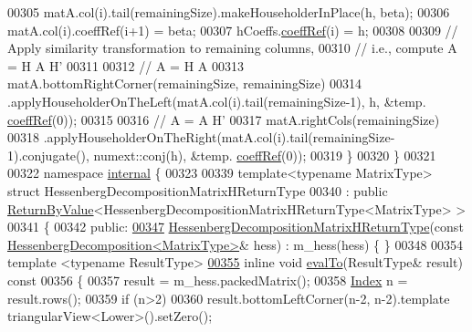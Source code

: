 \begin{DoxyCode}
00305     matA.col(i).tail(remainingSize).makeHouseholderInPlace(h, beta);
00306     matA.col(i).coeffRef(i+1) = beta;
00307     hCoeffs.\hyperlink{class_eigen_1_1_plain_object_base_a25626a55b26a4323565f79d1b7c48ea8}{coeffRef}(i) = h;
00308 
00309     \textcolor{comment}{// Apply similarity transformation to remaining columns,}
00310     \textcolor{comment}{// i.e., compute A = H A H'}
00311 
00312     \textcolor{comment}{// A = H A}
00313     matA.bottomRightCorner(remainingSize, remainingSize)
00314         .applyHouseholderOnTheLeft(matA.col(i).tail(remainingSize-1), h, &temp.
      \hyperlink{class_eigen_1_1_plain_object_base_a25626a55b26a4323565f79d1b7c48ea8}{coeffRef}(0));
00315 
00316     \textcolor{comment}{// A = A H'}
00317     matA.rightCols(remainingSize)
00318         .applyHouseholderOnTheRight(matA.col(i).tail(remainingSize-1).conjugate(), numext::conj(h), &temp.
      \hyperlink{class_eigen_1_1_plain_object_base_a25626a55b26a4323565f79d1b7c48ea8}{coeffRef}(0));
00319   \}
00320 \}
00321 
00322 \textcolor{keyword}{namespace }\hyperlink{namespaceinternal}{internal} \{
00323 
00339 \textcolor{keyword}{template}<\textcolor{keyword}{typename} MatrixType> \textcolor{keyword}{struct }HessenbergDecompositionMatrixHReturnType
00340 : \textcolor{keyword}{public} \hyperlink{group___core___module_class_eigen_1_1_return_by_value}{ReturnByValue}<HessenbergDecompositionMatrixHReturnType<MatrixType> >
00341 \{
00342   \textcolor{keyword}{public}:
\hyperlink{group___eigenvalues___module_aa6d46d84c1343c964c50457ca4ddf9fa}{00347}     \hyperlink{group___eigenvalues___module_aa6d46d84c1343c964c50457ca4ddf9fa}{HessenbergDecompositionMatrixHReturnType}(\textcolor{keyword}{const} 
      \hyperlink{group___eigenvalues___module}{HessenbergDecomposition<MatrixType>}& hess) : m\_hess(hess) \{ \}
00348 
00354     \textcolor{keyword}{template} <\textcolor{keyword}{typename} ResultType>
\hyperlink{group___eigenvalues___module_a7f1d84113072d2d2e507d3821ff9f15c}{00355}     \textcolor{keyword}{inline} \textcolor{keywordtype}{void} \hyperlink{group___eigenvalues___module_a7f1d84113072d2d2e507d3821ff9f15c}{evalTo}(ResultType& result)\textcolor{keyword}{ const}
00356 \textcolor{keyword}{    }\{
00357       result = m\_hess.packedMatrix();
00358       \hyperlink{namespace_eigen_a62e77e0933482dafde8fe197d9a2cfde}{Index} n = result.rows();
00359       \textcolor{keywordflow}{if} (n>2)
00360         result.bottomLeftCorner(n-2, n-2).template triangularView<Lower>().setZero();

\end{DoxyCode}
